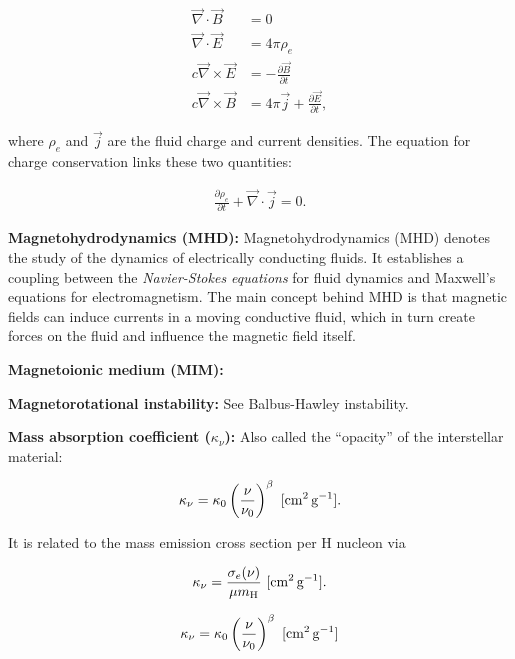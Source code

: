 \documentclass[a4paper,10pt]{article}
\begin{document}
\begin{align*}
    \vec\nabla\cdot\vec{B} &= 0 \\
    \vec\nabla\cdot\vec{E} &= 4\pi\rho_e \\
    c\vec\nabla\times\vec{E} &= - \frac{\partial\vec{B}}{\partial t} \\
    c\vec\nabla\times\vec{B} &= 4\pi\vec{j} + \frac{\partial\vec{E}}{\partial t},
\end{align*}

{\noindent}where $\rho_e$ and $\vec{j}$ are the fluid charge and current densities. The equation for charge conservation links these two quantities:

\begin{align*}
    \frac{\partial\rho_e}{\partial t} + \vec\nabla\cdot\vec{j} = 0.
\end{align*}

{\noindent}\textbf{Magnetohydrodynamics (MHD):} Magnetohydrodynamics (MHD) denotes the study of the dynamics of electrically conducting fluids. It establishes a coupling between the \textit{Navier-Stokes equations} for fluid dynamics and Maxwell's equations for electromagnetism. The main concept behind MHD is that magnetic fields can induce currents in a moving conductive fluid, which in turn create forces on the fluid and influence the magnetic field itself. 

{\noindent}\textbf{Magnetoionic medium (MIM):}

{\noindent}\textbf{Magnetorotational instability:} See Balbus-Hawley instability.

{\noindent}\textbf{Mass absorption coefficient ($\kappa_\nu$):} Also called the ``opacity'' of the interstellar material:

\begin{align*}
    \kappa_\nu = \kappa_0 \left(\frac{\nu}{\nu_0}\right)^\beta ~ [{\rm cm^2\,g^{-1}}].
\end{align*}

{\noindent}It is related to the mass emission cross section per H nucleon via

\begin{align*}
    \kappa_\nu = \frac{\sigma_e(\nu)}{\mu m_{\rm H}} ~ [{\rm cm^2\,g^{-1}}].
\end{align*}

\begin{align*}
    \kappa_\nu = \kappa_0 \left(\frac{\nu}{\nu_0}\right)^\beta ~ [{\rm cm^2\,g^{-1}}]
\end{align*}
\end{document}
